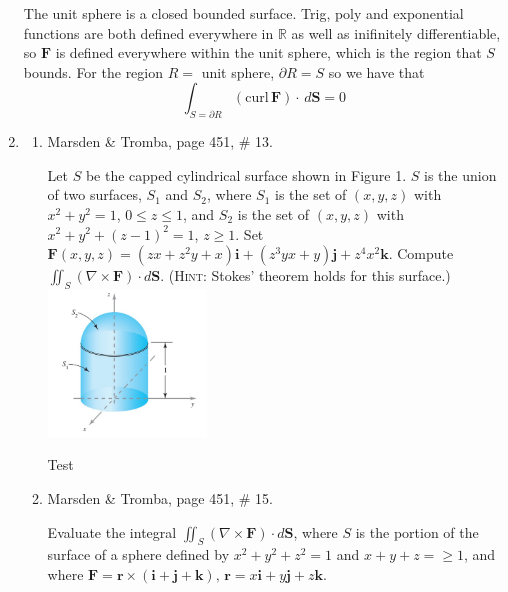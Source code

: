 \documentclass{article}
\begin{document}
\begin{enumerate}
    The unit sphere is a closed bounded surface. Trig, poly and exponential 
    functions are both defined everywhere in $\mathbb{R}$ as well as
    inifinitely differentiable, so $\boldsymbol F$ is defined everywhere
    within the unit sphere, which is the region that $S$ bounds. For the
    region $R =$ unit sphere, $\partial R = S$ so we have that
        \[\int_{S = \partial R} (\text{curl}\, \boldsymbol F)\cdot
        \, d \boldsymbol S = 0 \]
    \newpage
    \item 
    \begin{enumerate}
        \item Marsden \& Tromba, page 451, \# 13.
            \begin{multicols}{2}
            Let $S$ be the capped cylindrical surface shown in Figure 1. 
            $S$ is the union of two surfaces, $S_1$ and $S_2$, where $S_1$ 
            is the set of $(x,y,z)$ with $x^2 + y^2 = 1$, $0 \leq z \leq 1$, 
            and $S_2$ is the set of $(x,y,z)$ with $x^2 + y^2 + (z-1)^2 = 1$,
            $z \geq 1$. Set $\boldsymbol F (x,y,z) = (zx + z^2y + x) 
            \boldsymbol i + (z^3yx + y)\boldsymbol j + z^4x^2\boldsymbol k$.
            Compute $\displaystyle \iint_S (\nabla \times \boldsymbol F) \cdot
            d \boldsymbol S$. (\textsc{Hint}: Stokes' theorem holds for this
            surface.)
            \includegraphics[width=0.35\textwidth,right]{b42-a10-fig1}
            \end{multicols}

            Test


        \item Marsden \& Tromba, page 451, \# 15.

            Evaluate the integral $\displaystyle \iint_S (\nabla \times 
            \boldsymbol F) \cdot d \boldsymbol S$, where $S$ is the portion
            of the surface of a sphere defined by $x^2 + y^2 + z^2 = 1$ and
            $x + y + z = \geq 1$, and where $\boldsymbol F = \boldsymbol r
            \times ( \boldsymbol i + \boldsymbol j + \boldsymbol k),\, 
            \boldsymbol r = x \boldsymbol i + y \boldsymbol j + z \boldsymbol
            k.$


\end{enumerate}
\end{enumerate}
\end{document}
